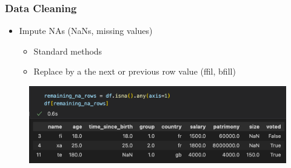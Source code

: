 \begin{frame}\frametitle{Data Cleaning}
   \begin{itemize}
      \item Impute NAs (NaNs, missing values)
      \begin{itemize}
         \item Standard methods
         \item Replace by a the next or previous row value (ffil, bfill)
      \end{itemize}
   \end{itemize}
   \vspace{.5cm}
   \begin{minipage}{0.58\linewidth}
      \begin{figure}[H]
         \includegraphics[scale=.35]{../images/illustrations/data_cleaning_na_imputation_const_1.png}
      \end{figure}
   \end{minipage}


\end{frame}
